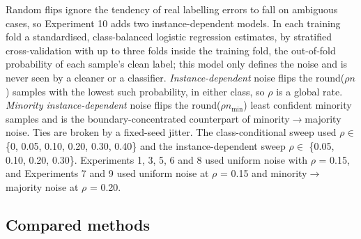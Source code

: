 \documentclass[conference]{IEEEtran}
\begin{document}
Random flips ignore the tendency of real labelling errors to fall on ambiguous cases, so Experiment 10 adds two instance-dependent models. In each training fold a standardised, class-balanced logistic regression estimates, by stratified cross-validation with up to three folds inside the training fold, the out-of-fold probability of each sample's clean label; this model only defines the noise and is never seen by a cleaner or a classifier. \emph{Instance-dependent} noise flips the round($\rho n$) samples with the lowest such probability, in either class, so $\rho $ is a global rate. \emph{Minority instance-dependent} noise flips the round($\rho n_{\mathrm{min}}$) least confident minority samples and is the boundary-concentrated counterpart of minority$\rightarrow $majority noise. Ties are broken by a fixed-seed jitter. The class-conditional sweep used $\rho  \in $ \{0, 0.05, 0.10, 0.20, 0.30, 0.40\} and the instance-dependent sweep $\rho  \in $ \{0.05, 0.10, 0.20, 0.30\}. Experiments 1, 3, 5, 6 and 8 used uniform noise with $\rho $ = 0.15, and Experiments 7 and 9 used uniform noise at $\rho $ = 0.15 and minority$\rightarrow $majority noise at $\rho $ = 0.20.

\subsection{Compared methods}\label{sec:compared-methods}
\end{document}
